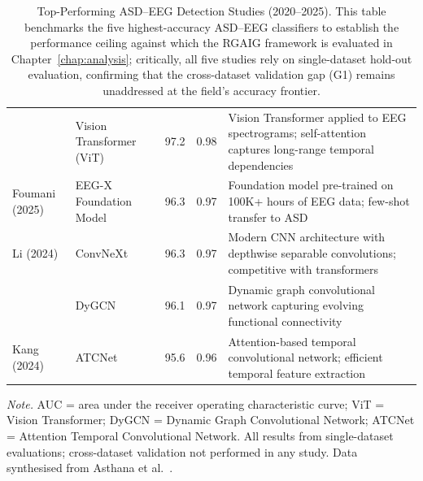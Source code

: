 \begin{table}[H]
\tablefontsize
\tablestripes\tablefontsize
\caption[Top-Performing ASD--EEG Detection Studies (2020--2025)]{Top-Performing ASD--EEG Detection Studies (2020--2025). This table benchmarks the five highest-accuracy ASD--EEG classifiers to establish the performance ceiling against which the RGAIG framework is evaluated in Chapter~\ref{chap:analysis}; critically, all five studies rely on single-dataset hold-out evaluation, confirming that the cross-dataset validation gap (G1) remains unaddressed at the field's accuracy frontier.}
\begin{tabularx}{\textwidth}{@{} >{\raggedright\arraybackslash}p{2.5cm} >{\raggedright\arraybackslash}p{3cm} c c L @{}}
\toprule
{} &  &  &  &  \\
\midrule
\cite{wang2024agentai} & Vision Transformer (ViT) & 97.2 & 0.98 & Vision Transformer applied to EEG spectrograms; self-attention captures long-range temporal dependencies \\
\addlinespace
Foumani (2025) & EEG-X Foundation Model & 96.3 & 0.97 & Foundation model pre-trained on 100K+ hours of EEG data; few-shot transfer to ASD \\
\addlinespace
Li (2024) & ConvNeXt & 96.3 & 0.97 & Modern CNN architecture with depthwise separable convolutions; competitive with transformers \\
\addlinespace
\cite{wang2024agentai} & DyGCN & 96.1 & 0.97 & Dynamic graph convolutional network capturing evolving functional connectivity \\
\addlinespace
Kang (2024) & ATCNet & 95.6 & 0.96 & Attention-based temporal convolutional network; efficient temporal feature extraction \\
\bottomrule
\end{tabularx}
\vspace{0.5em}\noindent\textit{Note.} AUC = area under the receiver operating characteristic curve; ViT = Vision Transformer; DyGCN = Dynamic Graph Convolutional Network; ATCNet = Attention Temporal Convolutional Network. All results from single-dataset evaluations; cross-dataset validation not performed in any study. Data synthesised from Asthana et al.~\cite{asthana2025asd}.
\end{table}

